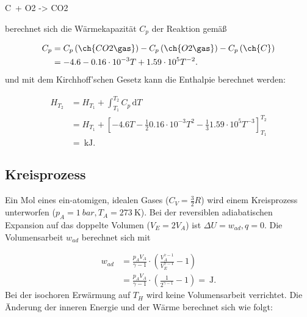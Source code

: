     \begin{reaction}
      C\sld \, + O2 \gas -> CO2 \gas 
    \end{reaction}
  berechnet sich die Wärmekapazität $C_p$ der Reaktion gemäß
  
    \begin{equation}
      \begin{split}
        C_p &= C_p \left(\ch{CO2\gas}\right) - C_p \left(\ch{O2\gas}\right) - C_p \left(\ch{C}\right) \\
            &= - 4.6 - 0.16 \cdot 10^{-3} T + 1.59 \cdot 10^5 T^{-2}.
      \end{split}
    \end{equation}
  und mit dem Kirchhoff'schen Gesetz kann die Enthalpie berechnet werden:
  
  \begin{equation}
    \begin{split}
      H_{T_2} &= H_{T_1} + \int_{T_1}^{T_2} C_p \, \text{d} T \\
              &= H_{T_1} + \left[- 4.6 T - \frac{1}{2} 0.16 \cdot 10^{-3} T^2 - \frac{1}{3}1.59 \cdot 10^5 T^{-3}\right]_{T_1}^{T_2} \\
              &= \SI[mode=text]{}{\kilo\joule}.
    \end{split}
  \end{equation}
  
  \subsection{Kreisprozess}
  
    Ein Mol eines ein-atomigen, idealen Gases ($C_V = \frac{3}{2} R$) wird einem Kreisprozess unterworfen ($p_A = \SI[mode=text]{1}{bar}, T_A = \SI[mode=text]{273}{\kelvin}$). Bei der reversiblen adiabatischen Expansion auf das doppelte Volumen ($V_E = 2 V_A$) ist $\Delta U = w_{ad}, q = 0$. Die Volumensarbeit $w_{ad}$ berechnet sich mit
    
    \begin{equation}
      \begin{split}
        w_{ad} &= \frac{p_A V_A}{\gamma - 1} \cdot \left(\frac{V_A^{\gamma - 1}}{V_E^{\gamma - 1}} - 1\right) \\
             &= \frac{p_A V_A}{\gamma - 1} \cdot \left(\frac{1}{2^{\gamma - 1}} - 1\right) = \SI[mode=text]{}{\joule}.
      \end{split}
    \end{equation}
    Bei der isochoren Erwärmung auf $T_H$ wird keine Volumensarbeit verrichtet. Die Änderung der inneren Energie und der Wärme berechnet sich wie folgt:
    
